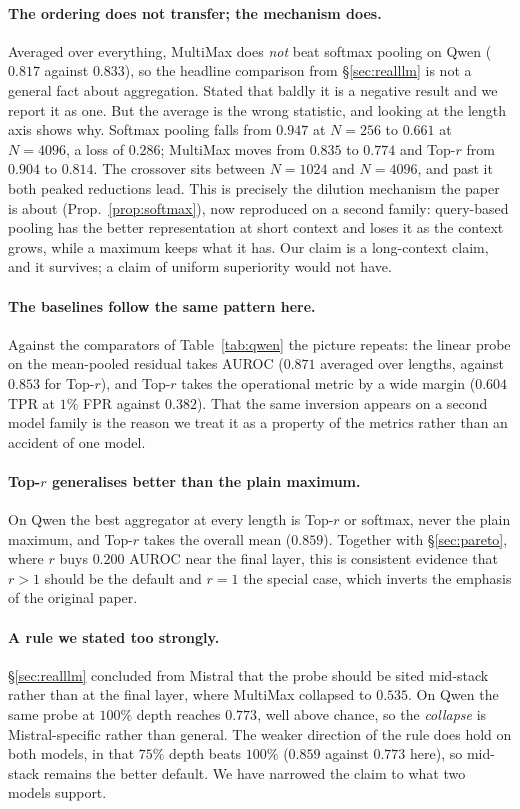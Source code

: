 \documentclass[10pt]{article}
\theoremstyle{plain}
\theoremstyle{definition}
\theoremstyle{remark}
\begin{document}
\paragraph{The ordering does not transfer; the mechanism does.} Averaged over everything,
MultiMax does \emph{not} beat softmax pooling on Qwen ($0.817$ against $0.833$), so the
headline comparison from \S\ref{sec:realllm} is not a general fact about aggregation.
Stated that baldly it is a negative result and we report it as one. But the average is the
wrong statistic, and looking at the length axis shows why. Softmax pooling falls from
$0.947$ at $N{=}256$ to $0.661$ at $N{=}4096$, a loss of $0.286$; MultiMax moves from
$0.835$ to $0.774$ and Top-$r$ from $0.904$ to $0.814$. The crossover sits between
$N{=}1024$ and $N{=}4096$, and past it both peaked reductions lead. This is precisely the
dilution mechanism the paper is about (Prop.~\ref{prop:softmax}), now reproduced on a
second family: query-based pooling has the better representation at short context and
loses it as the context grows, while a maximum keeps what it has. Our claim is a
long-context claim, and it survives; a claim of uniform superiority would not have.

\paragraph{The baselines follow the same pattern here.} Against the comparators of
Table~\ref{tab:qwen} the picture repeats: the linear probe on the mean-pooled residual
takes AUROC ($0.871$ averaged over lengths, against $0.853$ for Top-$r$), and Top-$r$
takes the operational metric by a wide margin ($0.604$ TPR at $1\%$ FPR against $0.382$).
That the same inversion appears on a second model family is the reason we treat it as a
property of the metrics rather than an accident of one model.

\paragraph{Top-$r$ generalises better than the plain maximum.} On Qwen the best aggregator
at every length is Top-$r$ or softmax, never the plain maximum, and Top-$r$ takes the
overall mean ($0.859$). Together with \S\ref{sec:pareto}, where $r$ buys $0.200$ AUROC
near the final layer, this is consistent evidence that $r{>}1$ should be the default and
$r{=}1$ the special case, which inverts the emphasis of the original paper.

\paragraph{A rule we stated too strongly.} \S\ref{sec:realllm} concluded from Mistral that
the probe should be sited mid-stack rather than at the final layer, where MultiMax
collapsed to $0.535$. On Qwen the same probe at $100\%$ depth reaches $0.773$, well above
chance, so the \emph{collapse} is Mistral-specific rather than general. The weaker
direction of the rule does hold on both models, in that $75\%$ depth beats $100\%$
($0.859$ against $0.773$ here), so mid-stack remains the better default. We have narrowed
the claim to what two models support.
\end{document}
